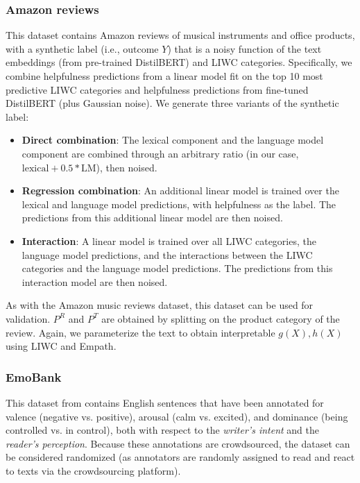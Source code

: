 \documentclass{article}
\begin{document}
\subsubsection{Amazon reviews}

This dataset contains Amazon reviews of musical instruments and office products, with a synthetic label (i.e., outcome $Y$) that is a noisy function of the text embeddings (from pre-trained DistilBERT) and LIWC categories. Specifically, we combine helpfulness predictions from a linear model fit on the top 10 most predictive LIWC categories and helpfulness predictions from fine-tuned DistilBERT (plus Gaussian noise). We generate three variants of the synthetic label:
\begin{itemize}
    \item \textbf{Direct combination}: The lexical component and the language model component are combined through an arbitrary ratio (in our case, $\text{lexical} + 0.5*\text{LM}$), then noised.
    \item \textbf{Regression combination}: An additional linear model is trained over the lexical and language model predictions, with helpfulness as the label. The predictions from this additional linear model are then noised.
    \item \textbf{Interaction}: A linear model is trained over all LIWC categories, the language model predictions, and the interactions between the LIWC categories and the language model predictions. The predictions from this interaction model are then noised.
\end{itemize}

As with the Amazon music reviews dataset, this dataset can be used for validation. $P^R$ and $P^T$ are obtained by splitting on the product category of the review. Again, we parameterize the text to obtain interpretable $g(X), h(X)$ using LIWC and Empath.

\subsubsection{EmoBank}
\label{sec:emobank_data_description}

This dataset from \cite{buechel2017emobank} contains English sentences that have been annotated for valence (negative vs. positive), arousal (calm vs. excited), and dominance (being controlled vs. in control), both with respect to the \textit{writer's intent} and the \textit{reader's perception}. Because these annotations are crowdsourced, the dataset can be considered randomized (as annotators are randomly assigned to read and react to texts via the crowdsourcing platform).
\end{document}
